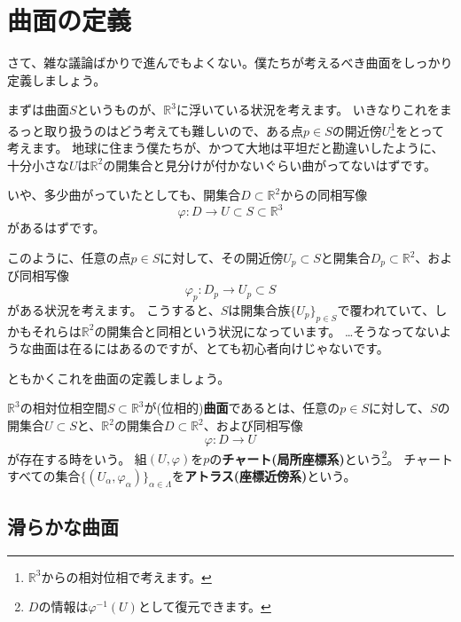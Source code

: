 \section{曲面の定義}

さて、雑な議論ばかりで進んでもよくない。僕たちが考えるべき曲面をしっかり定義しましょう。

まずは曲面$S$というものが、$\mathbb{R}^3$に浮いている状況を考えます。
いきなりこれをまるっと取り扱うのはどう考えても難しいので、ある点$p\in S$の開近傍$U$\footnote{
  $\mathbb{R}^3$からの相対位相で考えます。
}をとって考えます。
地球に住まう僕たちが、かつて大地は平坦だと勘違いしたように、十分小さな$U$は$\mathbb{R}^2$の開集合と見分けが付かないぐらい曲がってないはずです。

いや、多少曲がっていたとしても、開集合$D\subset\mathbb{R}^2$からの同相写像
\[
  \varphi:D\to U\subset S\subset\mathbb{R}^3
\]
があるはずです。

このように、任意の点$p\in S$に対して、その開近傍$U_p\subset S$と開集合$D_p\subset\mathbb{R}^2$、および同相写像
\[
  \varphi_p:D_p\to U_p\subset S
\]
がある状況を考えます。
こうすると、$S$は開集合族$\{U_p\}_{p\in S}$で覆われていて、しかもそれらは$\mathbb{R}^2$の開集合と同相という状況になっています。
…そうなってないような曲面は在るにはあるのですが、とても初心者向けじゃないです。

ともかくこれを曲面の定義しましょう。
\begin{definition}
  $\mathbb{R}^3$の相対位相空間$S\subset\mathbb{R}^3$が(位相的)\textbf{曲面}であるとは、任意の$p\in S$に対して、$S$の開集合$U\subset S$と、$\mathbb{R}^2$の開集合$D\subset\mathbb{R}^2$、および同相写像
  \[
    \varphi:D\to U
  \]
  が存在する時をいう。
  組$(U,\varphi)$を$p$の\textbf{チャート(局所座標系)}という\footnote{
    $D$の情報は$\varphi^{-1}(U)$として復元できます。
  }。
  チャートすべての集合$\{(U_\alpha,\varphi_\alpha)\}_{\alpha\in\Lambda}$を\textbf{アトラス(座標近傍系)}という。
\end{definition}

\subsection{滑らかな曲面}

